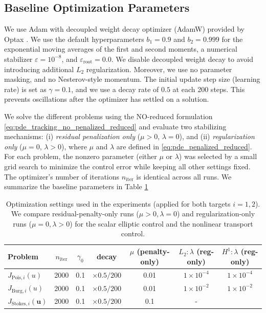 \documentclass[final,1p,times]{elsarticle}
\theoremstyle{plain} %
\theoremstyle{definition} %
\theoremstyle{remark} %
\begin{document}
\subsection{Baseline Optimization Parameters}
We use Adam with decoupled weight decay optimizer (AdamW) provided by Optax \cite{deepmind2020jax}. We use the default hyperparameters $b_1=0.9$ and $b_2=0.999$ for the exponential moving averages of the first and second moments, a numerical stabilizer $\varepsilon=10^{-8}$, and $\varepsilon_{\mathrm{root}}=0.0$. We disable decoupled weight decay to avoid introducing additional $L_2$ regularization. Moreover, we use no parameter masking, and no Nesterov-style momentum. The initial update step size (learning rate) is set as $\gamma=0.1$, and we use a decay rate of $0.5$ at each 200 steps. This prevents oscillations after the optimizer has settled on a solution.  

We solve the different problems using the NO-reduced formulation \eqref{eq:pde_tracking_no_penalized_reduced} and evaluate two stabilizing mechanisms: 
(i) \emph{residual penalization only} ($\mu>0$, $\lambda=0$), and 
(ii) \emph{regularization only} ($\mu=0$, $\lambda>0$), where $\mu$ and $\lambda$ are defined in \eqref{eq:pde_penalized_reduced}. 
For each problem, the nonzero parameter (either $\mu$ or $\lambda$) was selected by a small grid search to minimize the control error while keeping all other settings fixed. 
The optimizer's number of iterations $n_{\mathrm{iter}}$ is identical across all runs. We summarize the baseline parameters in Table \ref{tab:parameters_new}

\begin{table}[h!]
\centering
\caption{Optimization settings used in the experiments (applied for both targets $i=1,2$). We compare residual-penalty-only runs ($\mu>0,\lambda=0$) and regularization-only runs ($\mu=0,\lambda>0$) for the scalar elliptic control and the nonlinear transport control.}
\label{tab:parameters_new}
\scriptsize
\begin{tabular}{lccc|ccc}
\toprule
\textbf{Problem} & $n_{\mathrm{iter}}$ & $\gamma_0$ & decay & $\mu$ (penalty-only) & $L_2: \lambda$ (reg-only) &  $H^1:\lambda$ (reg-only)\\
\midrule
$J_{\mathrm{Pois},i}(u)$   & 2000 & 0.1 & $\times 0.5/200$ & 0.01 & $1\times 10^{-4}$ &$1\times 10^{-4}$ \\
$J_{\mathrm{Burg},i}(u)$   & 2000 & 0.1 & $\times 0.5/200$ & 0.01 & $1\times 10^{-2}$ & $1\times 10^{-2}$ \\
$J_{\mathrm{Stokes},i}(\mathbf{u})$ & 2000 & 0.1 & $\times 0.5/200$ & 0.1  & - \\
\bottomrule
\end{tabular}
\end{table}
\end{document}
